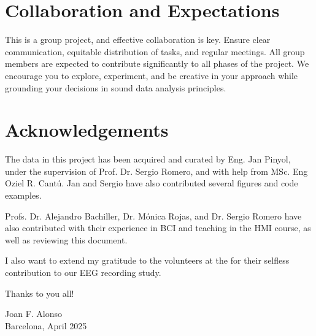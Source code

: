 \documentclass[11pt]{exam}
\begin{document}
    \section{Collaboration and Expectations} %

    This is a group project, and effective collaboration is key. Ensure clear communication, equitable distribution of tasks, and regular meetings. All group members are expected to contribute significantly to all phases of the project. We encourage you to explore, experiment, and be creative in your approach while grounding your decisions in sound data analysis principles.


    \newpage
    \section{Acknowledgements}
    The data in this project has been acquired and curated by Eng. Jan Pinyol, under the supervision of Prof. Dr. Sergio Romero, and with help from MSc. Eng Oziel R. Cantú. Jan and Sergio have also contributed several figures and code examples.

    Profs. Dr. Alejandro Bachiller, Dr. Mónica Rojas, and Dr. Sergio Romero have also contributed with their experience in BCI and teaching in the HMI course, as well as reviewing this document.

    I also want to extend my gratitude to the volunteers at the \href{https://bioart.upc.edu}{} for their selfless contribution to our EEG recording study.

    Thanks to you all!


    \begin{flushright}
        Joan F. Alonso\\
        Barcelona, April 2025
    \end{flushright}

    \newpage
    \nopagebreak
\end{document}

